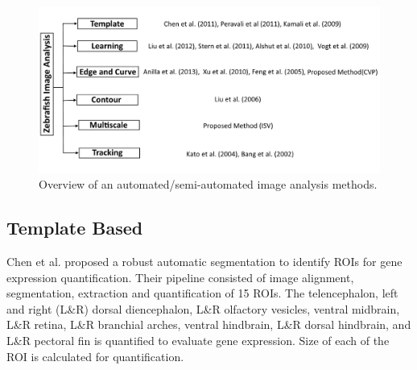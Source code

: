 \begin{landscape}
\begin{figure}[htb] 
 \begin{center}
    \includegraphics[scale=0.6]{figure/review.png}
  \end{center}
  \caption[Overview of an automated/semi-automated image analysis methods.]{Overview of an automated/semi-automated image analysis methods.}
 \label{overviewRelatedWrok}
\end{figure}
\end{landscape}
\par

\subsection{Template Based}

Chen et al. \cite{Chen11} proposed a robust automatic segmentation to identify ROIs for gene expression quantification. Their pipeline consisted of image alignment, segmentation, extraction and quantification of 15 ROIs. The telencephalon, left and right (L\&R) dorsal diencephalon, L\&R olfactory vesicles, ventral midbrain, L\&R retina, L\&R branchial arches, ventral hindbrain, L\&R dorsal hindbrain, and L\&R pectoral fin is quantified to evaluate gene expression. Size of each of the ROI is calculated for quantification. 

